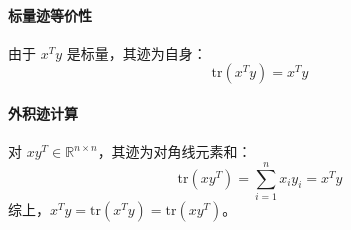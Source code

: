\paragraph{标量迹等价性}  
由于 \( x^T y \) 是标量，其迹为自身：
\[
\text{tr}(x^T y) = x^T y
\]

\paragraph{外积迹计算}  
对 \( xy^T \in \mathbb{R}^{n \times n} \)，其迹为对角线元素和：
\[
\text{tr}(xy^T) = \sum_{i=1}^n x_i y_i = x^T y
\]
综上，\( x^T y = \text{tr}(x^T y) = \text{tr}(xy^T) \)。